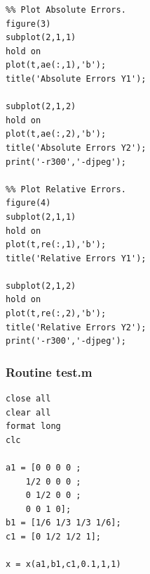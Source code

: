 \documentclass[a4paper,oneside]{book}
\numberwithin{equation}{chapter}
\begin{document}
\begin{verbatim}
%% Plot Absolute Errors.
figure(3)
subplot(2,1,1)
hold on
plot(t,ae(:,1),'b');
title('Absolute Errors Y1');

subplot(2,1,2)
hold on
plot(t,ae(:,2),'b');
title('Absolute Errors Y2');
print('-r300','-djpeg');

%% Plot Relative Errors.
figure(4)
subplot(2,1,1)
hold on
plot(t,re(:,1),'b');
title('Relative Errors Y1');

subplot(2,1,2)
hold on
plot(t,re(:,2),'b');
title('Relative Errors Y2');
print('-r300','-djpeg');
\end{verbatim}
\subsubsection{Routine test.m}
\begin{verbatim}
close all
clear all
format long
clc

a1 = [0 0 0 0 ;
    1/2 0 0 0 ;
    0 1/2 0 0 ;
    0 0 1 0];
b1 = [1/6 1/3 1/3 1/6];
c1 = [0 1/2 1/2 1];

x = x(a1,b1,c1,0.1,1,1)
\end{verbatim}
\end{document}
